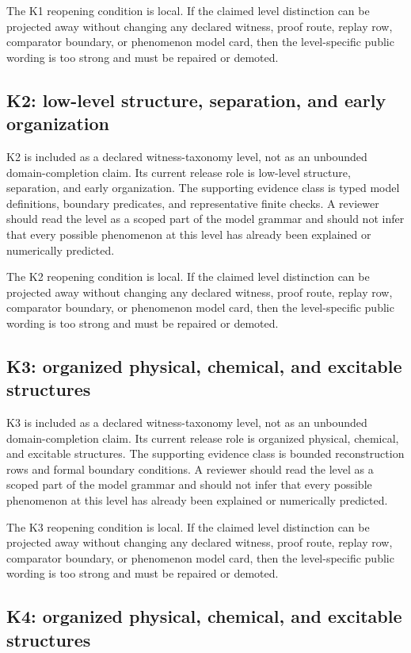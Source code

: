 The K1 reopening condition is local. If the claimed level distinction can be projected away without changing any declared witness, proof route, replay row, comparator boundary, or phenomenon model card, then the level-specific public wording is too strong and must be repaired or demoted.


\subsection{K2: low-level structure, separation, and early organization}

K2 is included as a declared witness-taxonomy level, not as an unbounded domain-completion claim. Its current release role is low-level structure, separation, and early organization. The supporting evidence class is typed model definitions, boundary predicates, and representative finite checks. A reviewer should read the level as a scoped part of the model grammar and should not infer that every possible phenomenon at this level has already been explained or numerically predicted.


The K2 reopening condition is local. If the claimed level distinction can be projected away without changing any declared witness, proof route, replay row, comparator boundary, or phenomenon model card, then the level-specific public wording is too strong and must be repaired or demoted.


\subsection{K3: organized physical, chemical, and excitable structures}

K3 is included as a declared witness-taxonomy level, not as an unbounded domain-completion claim. Its current release role is organized physical, chemical, and excitable structures. The supporting evidence class is bounded reconstruction rows and formal boundary conditions. A reviewer should read the level as a scoped part of the model grammar and should not infer that every possible phenomenon at this level has already been explained or numerically predicted.


The K3 reopening condition is local. If the claimed level distinction can be projected away without changing any declared witness, proof route, replay row, comparator boundary, or phenomenon model card, then the level-specific public wording is too strong and must be repaired or demoted.


\subsection{K4: organized physical, chemical, and excitable structures}


